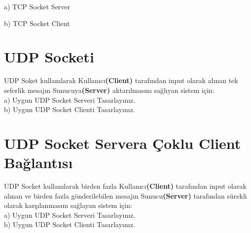 a) TCP Socket Server


b) TCP Socket Client



\section{UDP Socketi}

\begin{question}
UDP Soket kullanılarak Kullanıcı\textbf{(Client)} tarafından input olarak alınan tek seferlik mesajın Sunucuya\textbf{(Server)} aktarılmasını sağlıyan sistem için:
	\\ a) Uygun UDP Socket Serveri Tasarlayınız.
	\\ b) Uygun UDP Socket Clienti Tasarlayınız.  
\end{question}






\section{UDP Socket Servera Çoklu Client Bağlantısı}

\begin{question}
UDP Socket kullanılarak birden fazla Kullanıcı\textbf{(Client)} tarafından input olarak alınan ve birden fazla gönderilebilen mesajın Sunucu\textbf{(Server)} tarafından sürekli olarak karşılanmasını sağlayan sistem için:
	\\ a) Uygun UDP Socket Serveri Tasarlayınız.
	\\ b) Uygun UDP Socket Clienti Tasarlayınız. 
\end{question}






